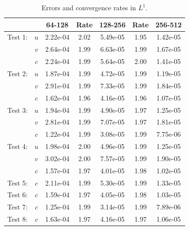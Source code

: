 \documentclass[final]{siamltex}
\begin{document}
\begin{table}[h]
\begin{center}
\caption{Errors and convergence rates in $L^1$.}
\label{tab:L1}
\begin{tabular}{ccccccc}
& & 64-128 & Rate & 128-256 & Rate & 256-512 \\
\hline
Test 1:             & $u$ & 2.22e-04 & 2.02 & 5.49e-05 & 1.95 & 1.42e-05 \\
                    & $v$ & 2.64e-04 & 1.99 & 6.63e-05 & 1.99 & 1.67e-05 \\
                    & $c$ & 2.24e-04 & 1.99 & 5.64e-05 & 2.00 & 1.41e-05 \\
\hline
Test 2:             & $u$ & 1.87e-04 & 1.99 & 4.72e-05 & 1.99 & 1.19e-05 \\
                    & $v$ & 2.91e-04 & 1.99 & 7.33e-05 & 1.99 & 1.84e-05 \\
                    & $c$ & 1.62e-04 & 1.96 & 4.16e-05 & 1.96 & 1.07e-05 \\
\hline
Test 3:             & $u$ & 1.94e-04 & 1.99 & 4.90e-05 & 1.97 & 1.25e-05 \\
                    & $v$ & 2.81e-04 & 1.99 & 7.07e-05 & 1.97 & 1.81e-05 \\
                    & $c$ & 1.22e-04 & 1.99 & 3.08e-05 & 1.99 & 7.75e-06 \\
\hline
Test 4:             & $u$ & 1.98e-04 & 2.00 & 4.96e-05 & 1.99 & 1.25e-05 \\
                    & $v$ & 3.02e-04 & 2.00 & 7.57e-05 & 1.99 & 1.90e-05 \\
                    & $c$ & 1.57e-04 & 1.97 & 4.01e-05 & 1.98 & 1.02e-05 \\
\hline
Test 5:             & $c$ & 2.11e-04 & 1.99 & 5.30e-05 & 1.99 & 1.33e-05 \\
\hline
Test 6:             & $c$ & 1.59e-04 & 1.97 & 4.05e-05 & 1.98 & 1.03e-05 \\
\hline
Test 7:             & $c$ & 1.25e-04 & 1.99 & 3.14e-05 & 1.99 & 7.89e-06 \\
\hline
Test 8:             & $c$ & 1.63e-04 & 1.97 & 4.16e-05 & 1.97 & 1.06e-05
\end{tabular}
\end{center}
\end{table}
\end{document}
